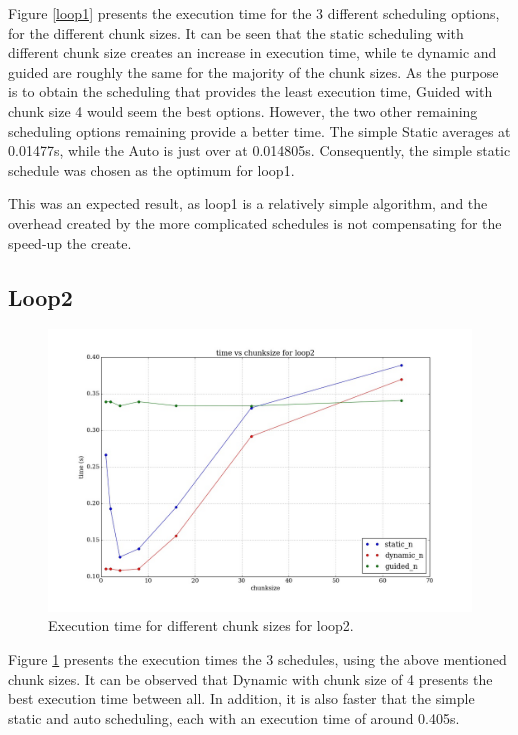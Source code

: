 \documentclass[12pt]{article}
\begin{document}
	Figure \ref{loop1} presents the execution time for the 3 different scheduling options, for the different chunk sizes. It can be seen that the static scheduling with different chunk size creates an increase in execution time, while te dynamic and guided are roughly the same for the majority of the chunk sizes. As the purpose is to obtain the scheduling that provides the least execution time, Guided with chunk size 4 would seem the best options. However, the two other remaining scheduling options remaining provide a better time. The simple Static averages at 0.01477s, while the Auto is just over at 0.014805s. Consequently, the simple static schedule was chosen as the optimum for loop1.
	
	This was an expected result, as loop1 is a relatively simple algorithm, and the overhead created by the more complicated schedules is not compensating for the speed-up the create. 
	
	\subsection{Loop2}
	\begin{figure}[H]	
		\centering
		\includegraphics[scale=0.4]{loop2.jpeg}
		\caption{Execution time for different chunk sizes for loop2.}\label{loop2}
	\end{figure}

	Figure \ref{loop2} presents the execution times the 3 schedules, using the above mentioned chunk sizes. It can be observed that Dynamic with chunk size of 4 presents the best execution time between all. In addition, it is also faster that the simple static and auto scheduling, each with an execution time of around 0.405s.
	
\end{document}
